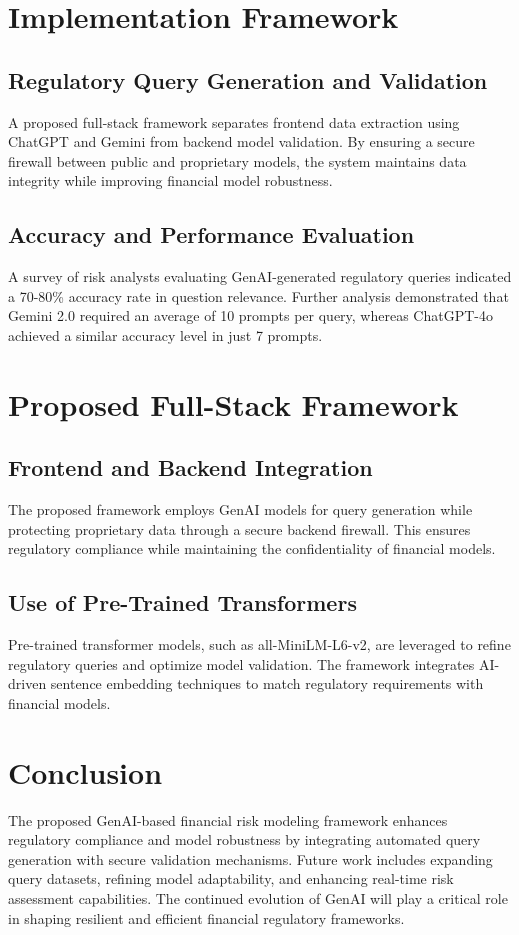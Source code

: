 \documentclass[a4paper,headinclude=on,footinclude=on,12pt,oneside]{scrbook}
\begin{document}
\section{Implementation Framework}

\subsection{Regulatory Query Generation and Validation}
A proposed full-stack framework separates frontend data extraction using ChatGPT and Gemini from backend model validation. By ensuring a secure firewall between public and proprietary models, the system maintains data integrity while improving financial model robustness.

\subsection{Accuracy and Performance Evaluation}
A survey of risk analysts evaluating GenAI-generated regulatory queries indicated a 70-80\% accuracy rate in question relevance. Further analysis demonstrated that Gemini 2.0 required an average of 10 prompts per query, whereas ChatGPT-4o achieved a similar accuracy level in just 7 prompts.

\section{Proposed Full-Stack Framework}

\subsection{Frontend and Backend Integration}
The proposed framework employs GenAI models for query generation while protecting proprietary data through a secure backend firewall. This ensures regulatory compliance while maintaining the confidentiality of financial models.

\subsection{Use of Pre-Trained Transformers}
Pre-trained transformer models, such as all-MiniLM-L6-v2, are leveraged to refine regulatory queries and optimize model validation. The framework integrates AI-driven sentence embedding techniques to match regulatory requirements with financial models.

\section{Conclusion}
The proposed GenAI-based financial risk modeling framework enhances regulatory compliance and model robustness by integrating automated query generation with secure validation mechanisms. Future work includes expanding query datasets, refining model adaptability, and enhancing real-time risk assessment capabilities. The continued evolution of GenAI will play a critical role in shaping resilient and efficient financial regulatory frameworks.
\end{document}
